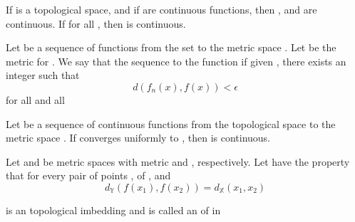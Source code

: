 \begin{theorem}\omitObviuos
      If  is a topological space, and if  are continuous functions, then ,  and  are continuous. If  for all , then  is continuous.
\end{theorem}

\begin{definition}\label{def:ConvergeUniformly}
      Let  be a sequence of functions from the set  to the metric space . Let  be the metric for . We say that the sequence   to the function  if given , there exists an integer  such that 
      \begin{equation*}
            d(f_{n}(x),f(x)) < \epsilon
      \end{equation*}
      for all  and all 
\end{definition}

\begin{theorem}\label{def:UniformLimitTheorem}
      Let  be a sequence of continuous functions from the topological space  to the metric space . If  converges uniformly to , then  is continuous.
\end{theorem}

\begin{definition}\label{def:IsometricImbedding}
      Let  and  be metric spaces with metric  and , respectively. Let  have the property that for every pair of points ,  of , and 
      \begin{equation*}
            d_{\mathbb{Y}}(f(x_{1}),f(x_{2})) = d_{\mathbb{X}}(x_{1},x_{2})
      \end{equation*}

       is an topological imbedding and is called an  of  in 
\end{definition}